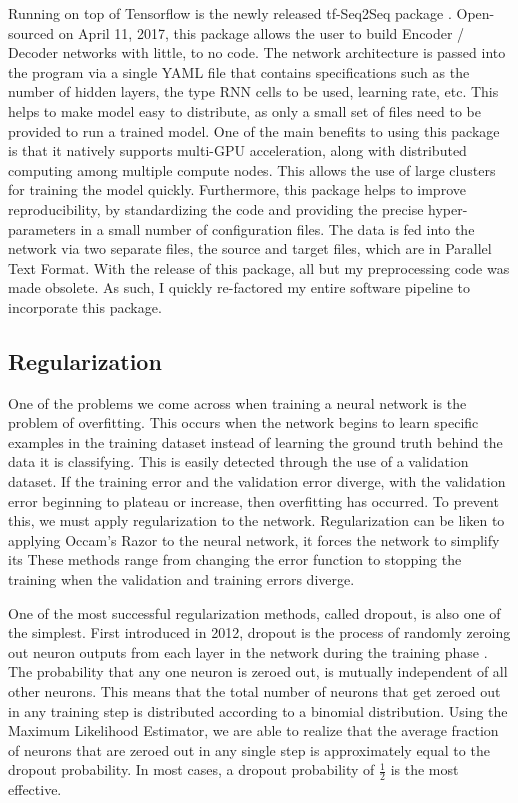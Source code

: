 \documentclass[pageno]{jpaper}
\begin{document}
\par
Running on top of Tensorflow is the newly released tf-Seq2Seq package \cite{britz:2017}.  Open-sourced on April 11, 2017, this package allows the user to build Encoder / Decoder networks with little, to no code.  The network architecture is passed into the program via a single YAML file that contains specifications such as the number of hidden layers, the type RNN cells to be used, learning rate, etc.  This helps to make model easy to distribute, as only a small set of files need to be provided to run a trained model.  One of the main benefits to using this package is that it natively supports multi-GPU acceleration, along with distributed computing among multiple compute nodes.  This allows the use of large clusters for training the model quickly.  Furthermore, this package helps to improve reproducibility, by standardizing the code and providing the precise hyper-parameters in a small number of configuration files.  The data is fed into the network via two separate files, the source and target files, which are in Parallel Text Format.  With the release of this package, all but my preprocessing code was made obsolete.  As such, I quickly re-factored my entire software pipeline to incorporate this package.

\subsection{Regularization}
One of the problems we come across when training a neural network is the problem of overfitting.  This occurs when the network begins to learn specific examples in the training dataset instead of learning the ground truth behind the data it is classifying.  This is easily detected through the use of a validation dataset.  If the training error and the validation error diverge, with the validation error beginning to plateau or increase, then overfitting has occurred.  To prevent this, we must apply regularization to the network.  Regularization can be liken to applying Occam's Razor to the neural network, it forces the network to simplify its  These methods range from changing the error function to stopping the training when the validation and training errors diverge.

\par
One of the most successful regularization methods, called dropout, is also one of the simplest.  First introduced in 2012, dropout is the process of randomly zeroing out neuron outputs from each layer in the network during the training phase \cite{hinton:2014}.  The probability that any one neuron is zeroed out, is mutually independent of all other neurons.  This means that the total number of neurons that get zeroed out in any training step is distributed according to a binomial distribution.  Using the Maximum Likelihood Estimator, we are able to realize that the average fraction of neurons that are zeroed out in any single step is approximately equal to the dropout probability.  In most cases, a dropout probability of $\frac{1}{2}$ is the most effective.
\end{document}
